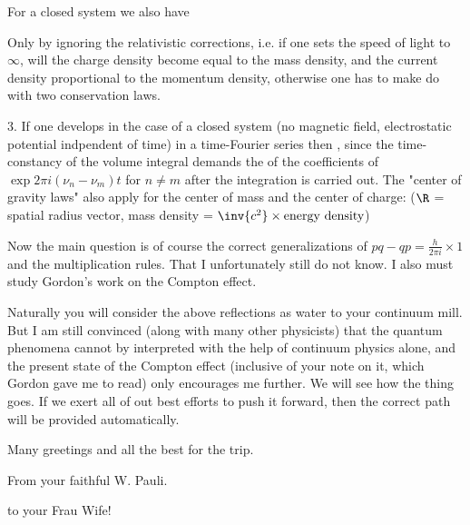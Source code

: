 For a closed system we also have

Only by ignoring the relativistic corrections, i.e. if one sets the speed of light to $\infty$, will the charge density become equal to the mass density, and the current density proportional to the momentum density, otherwise one has to make do with two conservation laws.

3. If one develops in the case of a closed system (no magnetic field, electrostatic potential indpendent of time) in a time-Fourier series
then , since the time-constancy of the volume integral demands the  of the coefficients of $\exp{2\pi i(\nu_n - \nu_m)t}$ for $n \neq m$ after the integration is carried out. The "center of gravity laws" also apply for the center of mass and the center of charge:
($\R$ = spatial radius vector, mass density = $\inv{c^2}\times\text{energy density}$)

Now the main question is of course the correct generalizations of $pq-qp=\frac{h}{2\pi i}\times 1$ and the multiplication rules. That I unfortunately still do not know. I also must study Gordon's work on the Compton effect.

Naturally you will consider the above reflections as water to your continuum mill. But I am still convinced (along with many other physicists) that the quantum phenomena cannot by interpreted with the help of continuum physics alone, and the present state of the Compton effect (inclusive of your note on it, which Gordon gave me to read) only encourages me further. We will see how the thing goes. If we exert all of out best efforts to push it forward, then the correct path will be provided automatically.

Many greetings and all the best for the trip.

From your faithful W. Pauli.

 to your Frau Wife!
